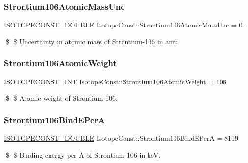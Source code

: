 \subsubsection{\texorpdfstring{Strontium106\+Atomic\+Mass\+Unc}{Strontium106AtomicMassUnc}}
{\footnotesize\ttfamily \mbox{\hyperlink{group___isotope_const-_macros_ga8f45a7272ce02c0b4c65c44636ed719a}{I\+S\+O\+T\+O\+P\+E\+C\+O\+N\+S\+T\+\_\+\+D\+O\+U\+B\+LE}} Isotope\+Const\+::\+Strontium106\+Atomic\+Mass\+Unc = 0.}

\$ \$ Uncertainty in atomic mass of Strontium-\/106 in amu. \mbox{\label{group___isotope_const-_strontium-_sr106_ga5e13387502e1eba590290b69286d8fcf}} 
\subsubsection{\texorpdfstring{Strontium106\+Atomic\+Weight}{Strontium106AtomicWeight}}
{\footnotesize\ttfamily \mbox{\hyperlink{group___isotope_const-_macros_ga5f18360b3e99483a35c32d789e62621c}{I\+S\+O\+T\+O\+P\+E\+C\+O\+N\+S\+T\+\_\+\+I\+NT}} Isotope\+Const\+::\+Strontium106\+Atomic\+Weight = 106}

\$ \$ Atomic weight of Strontium-\/106. \mbox{\label{group___isotope_const-_strontium-_sr106_ga618e8f38e0f552d04c3663ee046d964e}} 
\subsubsection{\texorpdfstring{Strontium106\+Bind\+E\+PerA}{Strontium106BindEPerA}}
{\footnotesize\ttfamily \mbox{\hyperlink{group___isotope_const-_macros_ga8f45a7272ce02c0b4c65c44636ed719a}{I\+S\+O\+T\+O\+P\+E\+C\+O\+N\+S\+T\+\_\+\+D\+O\+U\+B\+LE}} Isotope\+Const\+::\+Strontium106\+Bind\+E\+PerA = 8119}

\$ \$ Binding energy per A of Strontium-\/106 in keV. \mbox{\label{group___isotope_const-_strontium-_sr106_gaf57617eaf9f5cf6c90d85afd580a6e5d}} 
